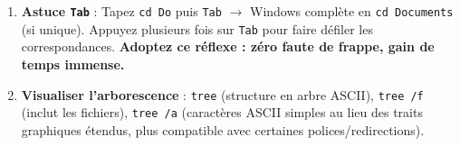 \documentclass[11pt]{article}
\begin{document}
\begin{methode}
\begin{enumerate}
\begin{itemize}
\begin{itemize}
            \item \texttt{cd NomDossier} : descend dans le sous-dossier.
            \item \texttt{cd ..} : remonte d'un niveau (parent).
            \item \texttt{cd \textbackslash} : va à la racine du lecteur courant.
            \item \texttt{cd /d X:} ou \texttt{cd /d X:\textbackslash Chemin} : change de lecteur \textbf{et} de dossier en une commande (indispensable pour passer de \texttt{C:} à \texttt{D:} ou clé USB \texttt{E:}). Sans \texttt{/d}, \texttt{cd X:\textbackslash Chemin} ne change que le répertoire courant \emph{sur X:} mais le prompt reste sur le lecteur d'origine.
        \end{itemize}
    \end{itemize}
    \item \textbf{Astuce \texttt{Tab}} : Tapez \texttt{cd Do} puis \texttt{Tab} $\to$ Windows complète en \texttt{cd Documents} (si unique). Appuyez plusieurs fois sur \texttt{Tab} pour faire défiler les correspondances. \textbf{Adoptez ce réflexe : zéro faute de frappe, gain de temps immense.}
    \item \textbf{Visualiser l'arborescence} : \texttt{tree} (structure en arbre ASCII), \texttt{tree /f} (inclut les fichiers), \texttt{tree /a} (caractères ASCII simples au lieu des traits graphiques étendus, plus compatible avec certaines polices/redirections).
\end{enumerate}
\end{methode}
\end{document}

